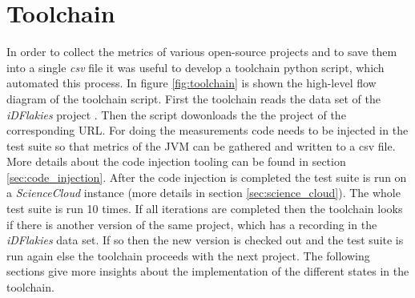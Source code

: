 \documentclass{seal_thesis}
\begin{document}
\section{Toolchain} \label{sec:toolchain}
In order to collect the metrics of various open-source projects and to save them into a single \textit{csv} file it was useful to develop a toolchain python script, which automated this process. In figure \ref{fig:toolchain} is shown the high-level flow diagram of the toolchain script. First the toolchain reads the data set of the \textit{iDFlakies} project \cite{lam19}. Then the script dowonloads the the project of the corresponding URL. For doing the measurements code needs to be injected in the test suite so that metrics of the JVM can be gathered and written to a csv file. More details about the code injection tooling can be found in section \ref{sec:code_injection}. After the code injection is completed the test suite is run on a \textit{ScienceCloud} \cite{cloud} instance (more details in section \ref{sec:science_cloud}). The whole test suite is run 10 times. If all iterations are completed then the toolchain looks if there is another version of the same project, which has a recording in the \textit{iDFlakies} data set. If so then the new version is checked out and the test suite is run again else the toolchain proceeds with the next project. The following sections give more insights about the implementation of the different states in the toolchain.
\end{document}
